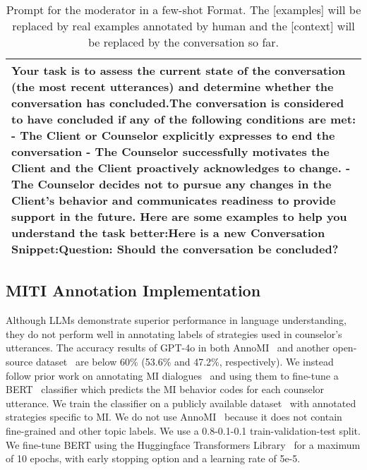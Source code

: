 \begin{table*}[tb]
\begin{tabularx}{\textwidth}{X}
\toprule
{\sf \footnotesize
Your task is to assess the current state of the conversation (the most recent utterances) and determine whether the conversation has concluded.\newline The conversation is considered to have concluded if any of the following conditions are met:\newline
- The Client or Counselor explicitly expresses to end the conversation \newline
- The Counselor successfully motivates the Client and the Client proactively acknowledges to change.\newline
- The Counselor decides not to pursue any changes in the Client's behavior and communicates readiness to provide support in the future.
\newline \newline Here are some examples to help you understand the task better:\newline [examples]\newline \newline \newline Here is a new Conversation Snippet:\newline [context]\newline \newline Question: Should the conversation be concluded?}  \\ \bottomrule
\end{tabularx}
\caption{Prompt for the moderator in a few-shot Format. The [examples] will be replaced by real examples annotated by human and the [context] will be replaced by the conversation so far.}
\label{tab:moderator prompt}
\end{table*}

\subsection{MITI Annotation Implementation}
\label{app:miti annotation}
Although LLMs demonstrate superior performance in language understanding, they do not perform well in annotating labels of strategies used in counselor's utterances. The accuracy results of GPT-4o in both AnnoMI~\citep{wu2022anno} and another open-source dataset~\citep{welivita2022curating} are below 60\% (53.6\% and 47.2\%, respectively). We instead follow prior work on annotating MI dialogues~\citep{shah2022modeling} and using them to fine-tune a BERT~\citep{kenton2019bert} classifier which predicts the MI behavior codes for each counselor utterance. We train the classifier on a publicly available dataset~\citep{welivita2022curating} with annotated strategies specific to MI.  We do not use AnnoMI~\citep{wu2022anno} because it does not contain fine-grained and other topic labels. We use a 0.8-0.1-0.1 train-validation-test split. We fine-tune BERT using the Huggingface Transformers Library~\citep{wolf2020transformers} for a maximum of 10 epochs, with early stopping option and a learning rate of 5e-5.


